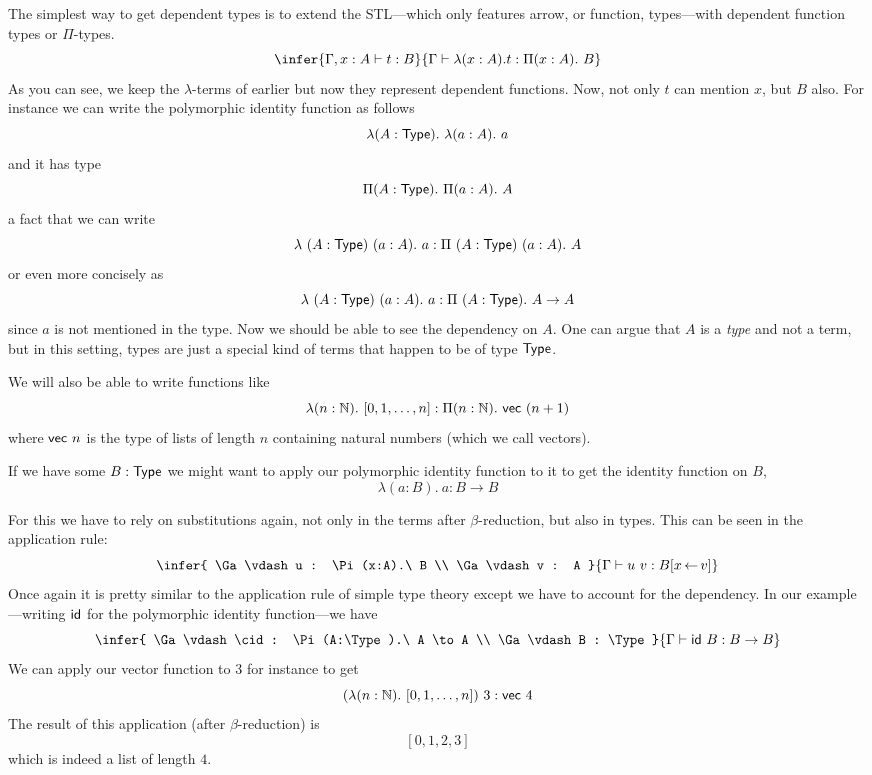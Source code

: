 The simplest way to get dependent types is to extend the \acrshort{STL}---which
only features arrow, or function, types---with dependent function types or
\(\Pi\)-types.
\[
  \infer
    {\Ga, x :A \vdash t : B}
    {\Ga \vdash \lambda (x:A).t : \Pi (x:A).\ B}
\]
As you can see, we keep the \(\lambda\)-terms of earlier but now they represent
dependent functions. Now, not only \(t\) can mention \(x\), but \(B\) also.
For instance we can write the polymorphic identity function as follows
\[
  \lambda (A : \mathsf{Type}).\ \lambda (a : A).\ a
\]
and it has type
\[
  \Pi (A : \mathsf{Type}).\ \Pi (a : A).\ A
\]
a fact that we can write
\[
  \lambda\ (A : \mathsf{Type})\ (a : A).\ a
  : \Pi\ (A : \mathsf{Type})\ (a : A).\ A
\]
or even more concisely as
\[
  \lambda\ (A : \mathsf{Type})\ (a : A).\ a
  : \Pi\ (A : \mathsf{Type}).\ A \to A
\]
since \(a\) is not mentioned in the type.
Now we should be able to see the dependency on \(A\).
One can argue that \(A\) is a \emph{type} and not a term, but in this setting,
types are just a special kind of terms that happen to be of type \(\mathsf{Type}\).

We will also be able to write functions like
\[
  \lambda (n : \mathbb{N}).\ [ 0, 1, \dots, n ] :
  \Pi (n : \mathbb{N}).\ \mathsf{vec}\ (n+1)
\]
where \(\mathsf{vec}\ n\) is the type of lists of length \(n\) containing natural
numbers (which we call vectors).

If we have some \(B : \mathsf{Type}\) we might want to apply our polymorphic identity
function to it to get the identity function on \(B\), \ie
\[
  \lambda (a:B).\ a : B \to B
\]

For this we have to rely on substitutions again, not only in the terms after
\(\beta\)-reduction, but also in types.
This can be seen in the application rule:
\[
  \infer
    {
      \Ga \vdash u : \Pi (x:A).\ B \\
      \Ga \vdash v : A
    }
    {\Ga \vdash u\ v : B[x \sto v]}
\]
Once again it is pretty similar to the application rule of simple type theory
except we have to account for the dependency. In our example---writing \(\mathsf{id}\)
for the polymorphic identity function---we have
\[
  \infer
    {
      \Ga \vdash \cid : \Pi (A:\Type).\ A \to A \\
      \Ga \vdash B : \Type
    }
    {\Ga \vdash \cid\ B : B \to B}
\]
We can apply our vector function to \(3\) for instance to get
\[
  (\lambda (n : \mathbb{N}).\ [ 0, 1, \dots, n ])\ 3 : \mathsf{vec}\ 4
\]
The result of this application (\ie after \(\beta\)-reduction) is
\[
  [0, 1, 2, 3]
\]
which is indeed a list of length \(4\).

